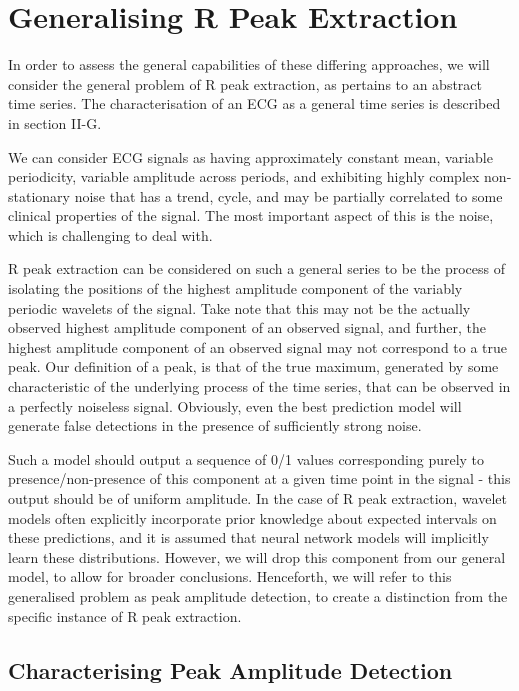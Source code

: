 \documentclass[9pt,conference]{IEEEtran}
\begin{document}
\section{Generalising R Peak Extraction}
In order to assess the general capabilities of these differing approaches, we will consider the general problem of R peak extraction, as pertains to an abstract time series. The characterisation of an ECG as a general time series is described in section II-G.

We can consider ECG signals as having approximately constant mean, variable periodicity, variable amplitude across periods, and exhibiting highly complex non-stationary noise that has a trend, cycle, and may be partially correlated to some clinical properties of the signal. The most important aspect of this is the noise, which is challenging to deal with.

R peak extraction can be considered on such a general series to be the process of isolating the positions of the highest amplitude component of the variably periodic wavelets of the signal. Take note that this may not be the actually observed highest amplitude component of an observed signal, and further, the highest amplitude component of an observed signal may not correspond to a true peak. Our definition of a peak, is that of the true maximum, generated by some characteristic of the underlying process of the time series, that can be observed in a perfectly noiseless signal. Obviously, even the best prediction model will generate false detections in the presence of sufficiently strong noise.

Such a model should output a sequence of 0/1 values corresponding purely to presence/non-presence of this component at a given time point in the signal - this output should be of uniform amplitude. In the case of R peak extraction, wavelet models often explicitly incorporate prior knowledge about expected intervals on these predictions, and it is assumed that neural network models will implicitly learn these distributions. However, we will drop this component from our general model, to allow for broader conclusions. Henceforth, we will refer to this generalised problem as peak amplitude detection, to create a distinction from the specific instance of R peak extraction. 

\subsection{Characterising Peak Amplitude Detection}
\end{document}
